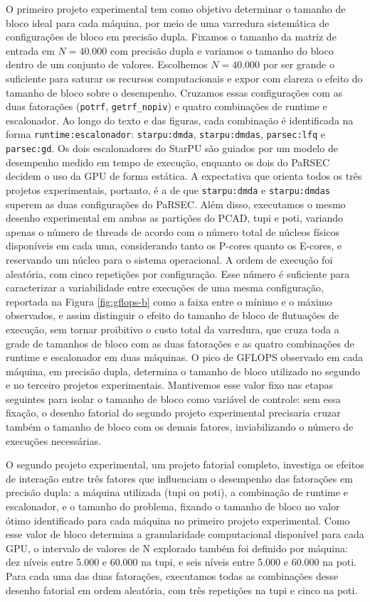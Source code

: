\documentclass[12pt]{article}
\begin{document}
O primeiro projeto experimental tem como objetivo determinar o tamanho de bloco
ideal para cada máquina, por meio de uma varredura sistemática de configurações
de bloco em precisão dupla. Fixamos o tamanho da matriz de entrada em \(N=40.000\)
com precisão dupla e variamos o tamanho do bloco dentro de um conjunto de
valores. Escolhemos \(N=40.000\) por ser grande o suficiente para saturar os
recursos computacionais e expor com clareza o efeito do tamanho de bloco sobre
o desempenho. Cruzamos essas configurações com as duas fatorações (\texttt{potrf},
\texttt{getrf\_nopiv}) e quatro combinações de runtime e escalonador. Ao longo do texto
e das figuras, cada combinação é identificada na forma \texttt{runtime:escalonador}:
\texttt{starpu:dmda}, \texttt{starpu:dmdas}, \texttt{parsec:lfq} e \texttt{parsec:gd}. Os dois escalonadores
do StarPU são guiados por um modelo de desempenho medido em tempo de execução,
enquanto os dois do PaRSEC decidem o uso da GPU de forma estática. A expectativa
que orienta todos os três projetos experimentais, portanto, é a de que
\texttt{starpu:dmda} e \texttt{starpu:dmdas} superem as duas configurações do PaRSEC. Além disso, executamos o mesmo desenho
experimental em ambas as partições do PCAD, tupi e poti, variando apenas o
número de threads de acordo com o número total de núcleos físicos disponíveis
em cada uma, considerando tanto os P-cores quanto os E-cores, e
reservando um núcleo para o sistema operacional. A ordem de execução foi
aleatória, com cinco repetições por configuração. Esse número é suficiente para
caracterizar a variabilidade entre execuções de uma mesma configuração,
reportada na Figura \ref{fig:gflops-b} como a faixa entre o mínimo e o máximo
observados, e assim distinguir o efeito do tamanho de bloco de flutuações de
execução, sem tornar proibitivo o custo total da varredura, que cruza toda a
grade de tamanhos de bloco com as duas fatorações e as quatro combinações de
runtime e escalonador em duas máquinas. O pico de GFLOPS observado em cada máquina,
em precisão dupla, determina o tamanho de bloco utilizado no segundo e no
terceiro projetos experimentais. Mantivemos esse valor fixo nas etapas
seguintes para isolar o tamanho de bloco como variável de controle: sem essa
fixação, o desenho fatorial do segundo projeto experimental precisaria cruzar
também o tamanho de bloco com os demais fatores, inviabilizando o número de
execuções necessárias.

O segundo projeto experimental, um projeto fatorial completo, investiga os
efeitos de interação entre três fatores que influenciam o desempenho das
fatorações em precisão dupla: a máquina utilizada (tupi ou poti), a combinação
de runtime e escalonador, e o tamanho do problema, fixando o tamanho de bloco no
valor ótimo identificado para cada máquina no primeiro projeto experimental.
Como esse valor de bloco determina a granularidade computacional disponível para
cada GPU, o intervalo de valores de N explorado também foi definido por máquina:
dez níveis entre 5.000 e 60.000 na tupi, e seis níveis entre 5.000 e 60.000 na
poti. Para cada uma das duas fatorações, executamos todas as combinações desse
desenho fatorial em ordem aleatória, com três repetições na tupi e cinco na
poti.
\end{document}
